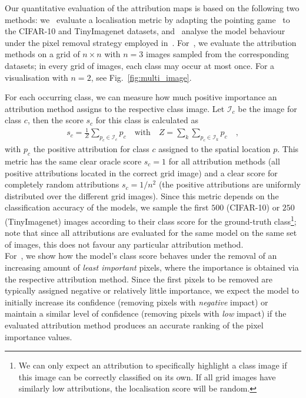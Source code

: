 Our quantitative evaluation of the attribution maps is based on the following two methods:
we
    \mbox{ evaluate} a localisation metric by adapting the pointing game~\cite{zhang2018top} to the CIFAR-10 and TinyImagenet datasets, and 
    \mbox{ analyse} the model behaviour under the pixel removal strategy employed in~\cite{srinivas2019full}.
For~, 
we evaluate the attribution methods on a grid of $ n\times n$ with $n=3$ images sampled from the corresponding datasets; in every grid of images, each class may occur at most once. 
For a visualisation with $n=2$, see
Fig.~\ref{fig:multi_image}.


%
For each occurring class, we can measure how much positive importance an attribution method assigns to the respective class image.
Let $\mathcal{I}_c$ be the image for class $c$, then the score $s_c$ for this class is calculated as 
\begin{align}
\label{eq:loc_metric}
            \textstyle s_c = \frac{1}{Z}\sum_{p_c \in \mathcal{I}_c} p_c \quad \text{with}\quad 
            Z = {\sum_k\sum_{p_c \in \mathcal{I}_k} p_c}\quad ,
        \end{align}
        with $p_c$ the positive attribution for class $c$ assigned to the spatial location $p$.
        This metric has the same clear oracle score  $s_c=1$ for all attribution methods (all positive attributions located in the correct grid image)
        and a clear score for completely random attributions $s_c=1/n^2$ (the positive attributions are uniformly distributed over the different grid images).
        Since this metric depends on the classification accuracy of the models, we sample the first $500$ (CIFAR-10) or $250$ (TinyImagenet) images according to their class score for the ground-truth class\footnote{
        We can only expect an attribution to specifically highlight a class image if this image can be correctly classified on its own. If all grid images have similarly low attributions, the localisation score will be random.
        }; note that since all attributions are evaluated for the same model on the same set of images, this does not favour any particular attribution method.\\
For~, we show how the model's class score behaves under the removal of an increasing amount of \emph{least important} pixels,
    where the importance is obtained via the respective attribution method. Since the first pixels to be removed are typically assigned negative or relatively little importance, we expect the model to initially increase its confidence (removing pixels with \emph{negative} impact) or maintain a similar level of confidence (removing pixels with \emph{low} impact) if the evaluated attribution method produces an accurate ranking of the pixel importance values. 
